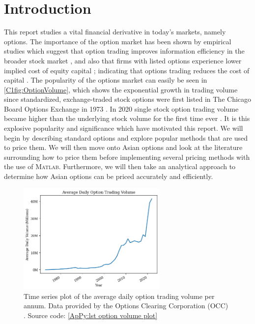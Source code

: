 \chapter{Introduction}
This report studies a vital financial derivative in today's markets, namely options. The importance of the option market has been shown by empirical studies which suggest that option trading improves information efficiency in the broader stock market \cite{PanInfoEffic,li2021effect}, and also that firms with listed options experience lower implied cost of equity capital \cite{naikerLowEquity}; indicating that options trading reduces the cost of capital \cite{li2021effect}. The popularity of the options market can easily be seen in \autoref{C1fig:OptionVolume}, which shows the exponential growth in trading volume since standardized, exchange-traded stock options were first listed in The Chicago Board Options Exchange in 1973 \cite{markham2002financial}. In 2020 single stock option trading volume became higher than the underlying stock volume for the first time ever \cite{yahooOptions}. 
\nline{}
It is this explosive popularity and significance which have motivated this report. We will begin by describing standard options and explore popular methods that are used to price them. We will then move onto Asian options and look at the literature surrounding how to price them before implementing several pricing methods with the use of \textsc{Matlab}. Furthermore, we will then take an analytical approach to determine how Asian options can be priced accurately and efficiently.

\begin{figure}[H]
    \centering
    \includegraphics[width=0.65\textwidth]{Chapters/C1/plots/OptionVolume.png}
    \caption{Time series plot of the average daily option trading volume per annum. Data provided by the Options Clearing Corporation (OCC) \cite{THEOCC}. 
    Source code: \autoref{ApPy:lst option volume plot}
    }
    \label{C1fig:OptionVolume}
\end{figure}

